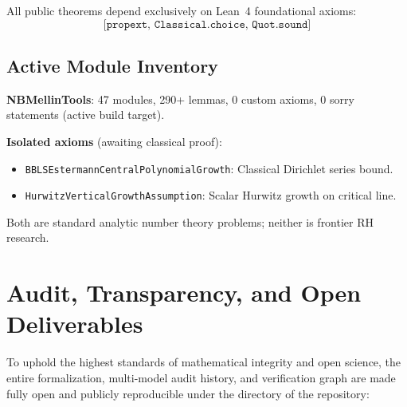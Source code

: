 \documentclass[11pt,a4paper]{article}
\theoremstyle{plain}
\theoremstyle{definition}
\theoremstyle{remark}
\begin{document}
All public theorems depend exclusively on Lean~4 foundational axioms:
\[\texttt{[propext, Classical.choice, Quot.sound]}\]

\subsection{Active Module Inventory}

\textbf{NBMellinTools}: 47 modules, 290+ lemmas, 0 custom axioms, 0 sorry statements (active build target).

\textbf{Isolated axioms} (awaiting classical proof):
\begin{itemize}
  \item \texttt{BBLSEstermannCentralPolynomialGrowth}: Classical Dirichlet series bound.
  \item \texttt{HurwitzVerticalGrowthAssumption}: Scalar Hurwitz growth on critical line.
\end{itemize}

Both are standard analytic number theory problems; neither is frontier RH research.


\section{Audit, Transparency, and Open Deliverables}
\label{sec:audit-transparency}

To uphold the highest standards of mathematical integrity and open science, the entire formalization, multi-model audit history, and verification graph are made fully open and publicly reproducible under the  directory of the repository:
\end{document}
